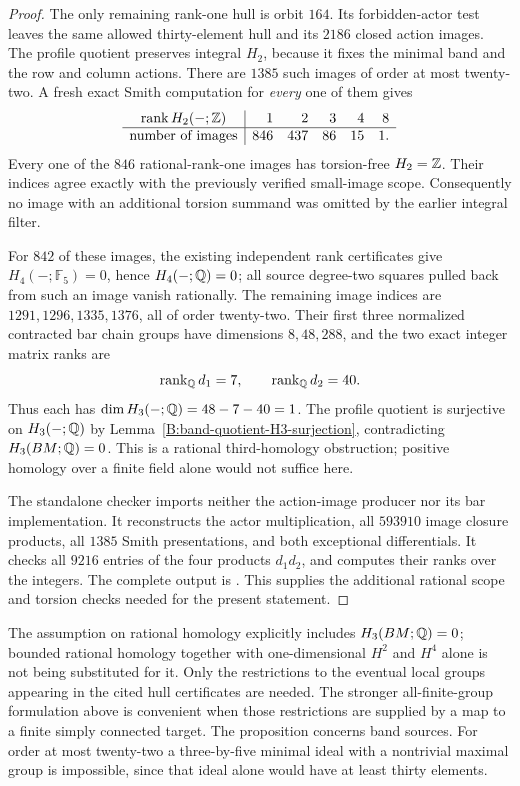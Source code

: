 \begin{proof}
The only remaining rank-one hull is orbit $164$.  Its forbidden-actor
test leaves the same allowed thirty-element hull and its $2186$
closed action images.  The profile quotient preserves integral $H_2$,
because it fixes the minimal band and the row and column actions.
There are $1385$ such images of order at most twenty-two.  A fresh
exact Smith computation for \emph{every} one of them gives
\[
\begin{array}{c|rrrrr}
 \operatorname{rank}H_2(-;\mathbb Z)&1&2&3&4&8\\\hline
 \text{number of images}&846&437&86&15&1.
\end{array}
\]
Every one of the $846$ rational-rank-one images has torsion-free
$H_2=\mathbb Z$.  Their indices agree exactly with the previously verified
small-image scope.  Consequently no image with an additional torsion
summand was omitted by the earlier integral filter.

For $842$ of these images, the existing independent rank certificates
give $H_4(-;\mathbb F_5)=0$, hence $H_4(-;\mathbb Q)=0$; all source
degree-two squares pulled back from such an image vanish rationally.
The remaining image indices are $1291,1296,1335,1376$, all of order
twenty-two.  Their first three normalized contracted bar chain groups
have dimensions $8,48,288$, and the two exact integer matrix ranks are
\[
 \operatorname{rank}_{\mathbb Q}d_1=7,\qquad
 \operatorname{rank}_{\mathbb Q}d_2=40.
\]
Thus each has $\dim H_3(-;\mathbb Q)=48-7-40=1$.
The profile quotient is surjective on $H_3(-;\mathbb Q)$ by
Lemma~\ref{B:band-quotient-H3-surjection}, contradicting
$H_3(BM;\mathbb Q)=0$.  This is a rational third-homology obstruction;
positive homology over a finite field alone would not suffice here.

The standalone checker
imports neither the action-image producer nor its bar implementation.
It reconstructs the actor multiplication, all $593910$ image closure
products, all $1385$ Smith presentations, and both exceptional
differentials.  It checks all $9216$ entries of the four products
$d_1d_2$, and computes their ranks over the integers.
The complete output is
.
This supplies the additional rational scope and torsion checks needed
for the present statement.
\end{proof}

\begin{remark}\label{B:three-by-five-transfer-scope}
The assumption on rational homology explicitly includes
$H_3(BM;\mathbb Q)=0$; bounded rational homology together with one-dimensional
$H^2$ and $H^4$ alone is not being substituted for it.  Only the
restrictions to the eventual local groups appearing in the cited hull
certificates are needed.  The stronger all-finite-group formulation
above is convenient when those restrictions are supplied by a map to
a finite simply connected target.  The proposition concerns band
sources.  For order at most twenty-two a three-by-five minimal ideal
with a nontrivial maximal group is impossible, since that ideal alone
would have at least thirty elements.
\end{remark}
